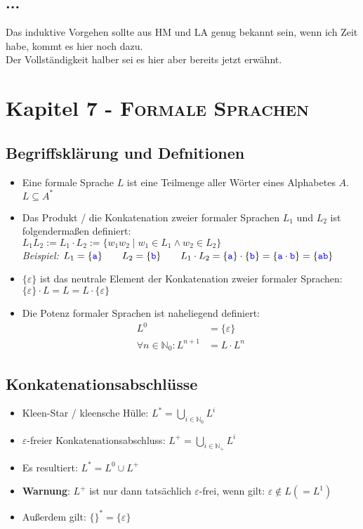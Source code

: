 \documentclass{article}
\newcommand{\N}{\mathbb{N_+}} %
\newcommand{\Nz}{{\mathbb{N}_0}} %
\newcommand{\kapitel}[2]{Kapitel #1 - \textsc{#2}}
\newcommand{\blue}[1]{\textcolor{blue}{#1}}
\newcommand{\strongColor}[1]{\textcolor{strongColor}{#1}}
\newcommand{\strong}[1]{\textbf{\strongColor{#1}}}
\newcommand{\important}[1]{\textcolor{importantColor}{#1}}
\newcommand{\example}[1]{\textit{Beispiel: }#1}
\newcommand{\word}[1]{\blue{\texttt{#1}}}
\newcommand{\set}[1]{\{#1\}}
\begin{document}
\subsection{...}
Das induktive Vorgehen sollte aus HM und LA genug bekannt sein, wenn ich Zeit habe, kommt es hier noch dazu.\\
Der Vollständigkeit halber sei es hier aber bereits jetzt erwähnt.

\newpage
\section{\kapitel{7}{Formale Sprachen}}
\subsection{Begriffsklärung und Defnitionen}
\begin{itemize}
    \item Eine \important{formale Sprache} $L$ ist eine Teilmenge aller Wörter eines Alphabetes $A$.\\
    $L\subseteq A^*$
    \item Das Produkt / die Konkatenation zweier formaler Sprachen $L_1$ und $L_2$ ist folgendermaßen definiert:\\
    $L_1L_2 := L_1\cdot L_2 := \set{w_1w_2 \mid w_1 \in L_1 \land w_2 \in L_2}$\\
    \example{$L_1=\set{\word{a}} \qquad L_2=\set{\word{b}} \qquad L_1\cdot L_2=\set{\word{a}}\cdot\set{\word{b}} = \set{\word{a}\cdot\word{b}} = \set{\word{ab}}$}
    \item $\set{\varepsilon}$ ist das neutrale Element der Konkatenation zweier formaler Sprachen:\\
    $\set{\varepsilon}\cdot L = L = L\cdot\set{\varepsilon}$
    \item Die Potenz formaler Sprachen ist naheliegend definiert:
    \begin{align}
        L^0 &= \set{\varepsilon}\\
        \forall n\in\Nz: L^{n+1}&=L\cdot L^n
    \end{align}
\end{itemize}
\subsection{Konkatenationsabschlüsse}
\begin{itemize}
    \item \important{Kleen-Star} / \important{kleensche Hülle}: 
    $L^* = \displaystyle{\bigcup_{i\in\Nz}}L^i$
    \item \important{$\varepsilon$-freier Konkatenationsabschluss}:
    $L^+ = \displaystyle{\bigcup_{i\in\N}}L^i$
    \item Es resultiert: $L^* = L^0 \cup L^+$
    \item \strong{Warnung}: $L^+$ ist nur dann tatsächlich $\varepsilon$-frei, wenn gilt: $\varepsilon\notin L(=L^1)$
    \item Außerdem gilt: $\set{}^*=\set{\varepsilon}$
\end{itemize}
\end{document}

